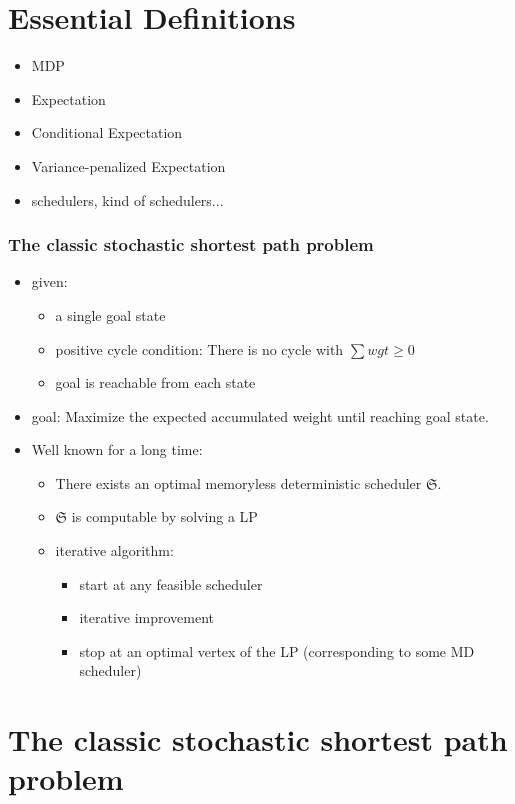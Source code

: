 \documentclass[onlymath]{beamer}
\begin{document}
\section{Essential Definitions}

\begin{frame}
\begin{itemize}
	\item MDP
	\item Expectation
	\item Conditional Expectation
	\item Variance-penalized Expectation
	\item schedulers, kind of schedulers...
\end{itemize}
\end{frame}

\begin{frame}
\frametitle{The classic stochastic shortest path problem}
	\begin{itemize}
		\item given:
		\begin{itemize}
			\item a single goal state
			\item positive cycle condition: There is no cycle with $\sum{wgt} \geq 0$
			\item goal is reachable from each state
		\end{itemize}
		\item goal: Maximize the expected accumulated weight until reaching goal state.
		\item Well known for a long time:
		\begin{itemize}
			\item There exists an optimal memoryless deterministic scheduler $\mathfrak{S}$.
			\item $\mathfrak{S}$ is computable by solving a LP
			\item iterative algorithm:
			\begin{itemize}
				\item start at any feasible scheduler
				\item iterative improvement
				\item stop at an optimal vertex of the LP (corresponding to some MD scheduler)
			\end{itemize}
		\end{itemize}
	\end{itemize}
\end{frame}%

\section{The classic stochastic shortest path problem}
\end{document}
